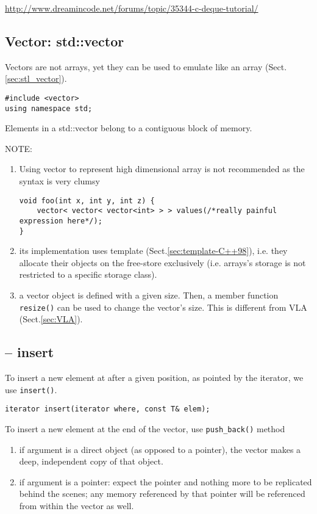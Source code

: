 \url{http://www.dreamincode.net/forums/topic/35344-c-deque-tutorial/}

  
\subsection{Vector: std::vector}
\label{sec:std::vector}

Vectors are not arrays, yet they can be used to emulate like an array
(Sect.\ref{sec:stl_vector}). 
\begin{verbatim}
#include <vector>
using namespace std;
\end{verbatim}
Elements in a std::vector belong to a contiguous block of memory.


NOTE:
\begin{enumerate}
  \item Using vector to represent high dimensional array is not recommended as the
syntax is very clumsy
\begin{Verbatim}
void foo(int x, int y, int z) {
    vector< vector< vector<int> > > values(/*really painful expression here*/);
}
\end{Verbatim}

  \item its implementation uses template (Sect.\ref{sec:template-C++98}), i.e.
  they allocate their objects on the free-store exclusively (i.e.
  arrays's storage is not restricted to a specific storage class). 
  
  \item a vector object is defined with a given size. Then, a member function
  \verb!resize()! can be used to change the vector's size. This is different
  from VLA (Sect.\ref{sec:VLA}).
\end{enumerate}


\label{sec:stl_vector}

\subsection{-- insert}

To insert a new element at after a given position, as pointed by the iterator,
we use \verb!insert()!.
\begin{verbatim}
iterator insert(iterator where, const T& elem);
\end{verbatim}

To insert a new element at the end of the vector, use
\verb!push_back()! method
\begin{enumerate}
  
  \item if argument is a direct object (as opposed to a pointer), the vector
  makes a deep, independent copy of that object.
  
  \item if argument is a pointer: expect the pointer and nothing more to be
  replicated behind the scenes; any memory referenced by that pointer will be
  referenced from within the vector as well.

\end{enumerate}

